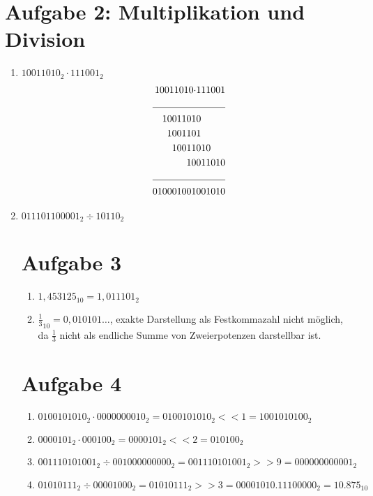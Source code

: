 \documentclass[a4paper]{article}
\begin{document}
\section*{Aufgabe 2: Multiplikation und Division}
\begin{enumerate}[label=\alph*)]
\item $10011010_2 \cdot 111001_2$\\
    \begin{equation}
    \begin{split}
        10011010 \cdot &111001\\
        \cline{1-2}
                1001101&0\\
                 100110&1\\
                  10011&010\\
                     10&011010\\
        \cline{1-2}
              010001001&001010\\
    \end{split}
    \end{equation}
\item $011101100001_2 \div 10110_2$

\section*{Aufgabe 3}
\begin{enumerate}[label=\alph*)]
\item $1,453125_{10} = 1,011101_2$
\item $\frac{1}{3}_{10} = 0,010101\ldots$, exakte Darstellung als Festkommazahl nicht möglich,
    da $\frac{1}{3}$ nicht als endliche Summe von Zweierpotenzen darstellbar ist.
\end{enumerate}

\section*{Aufgabe 4}
\begin{enumerate}[label=\alph*)]
    \item $0100101010_2 \cdot 0000000010_2 = 0100101010_2 << 1 = 1001010100_2$
    \item $0000101_2 \cdot 000100_2 = 0000101_2 << 2 = 010100_2$
    \item $001110101001_2 \div 001000000000_2 = 001110101001_2 >> 9 =000000000001_2 $
    \item $01010111_2 \div 00001000_2 = 01010111_2 >> 3 = 00001010.11100000_2 = 10.875_{10}$
\end{enumerate}


\end{enumerate}
\end{document}

